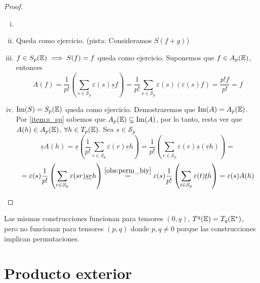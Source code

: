 \begin{proof}
    \begin{enumerate}[i)]
        \item[]
        \item Queda como ejercicio. (pista: Consideramos $S(f+g)$)
        \item $f \in S_p(\mathbb{E}) \implies S(f) = f$ queda como ejercicio.
        Suponemos que $f \in A_p(\mathbb{E})$, entonces
        \[
            A(f) = \frac{1}{p!} \left(\sum_{s \in \mathcal{S}_p} \varepsilon(s)\underline{s}f \right)
            = \frac{1}{p!}\sum_{s \in \mathcal{S}_p} \varepsilon(s) \left( \varepsilon(s)f \right) =
            \frac{p!f}{p!} = f
        \]
        \item $\operatorname{Im}(S)=S_p(\mathbb{E})$ queda como ejercicio. Demostraremos que $\operatorname{Im}(A)=A_p(\mathbb{E})$.
        Por \ref{item:s_sp} sabemos que $A_p(\mathbb{E}) \subseteq \operatorname{Im}(A)$, por lo tanto, resta
        ver que $A(h)\in A_p(\mathbb{E})$, $\forall h \in T_p(\mathbb{E})$. Sea $s \in \mathcal{S}_p$
        \[
            \underline{s}A(h) = \underline{s}\left( \frac{1}{p!}\sum_{r \in \mathcal{S}_p} \varepsilon(r)\underline{r}h
            \right) = \frac{1}{p!}\left(\sum_{r \in \mathcal{S}_p} \varepsilon(r)\underline{s}(\underline{r}h)\right) =
        \]
        \[
            = \varepsilon(s)\frac{1}{p!} \left( \sum_{r \in \mathcal{S}_p} \varepsilon(sr) \underline{sr}h \right)
            \stackrel{\ref{obs:perm_biy}}{=} \varepsilon(s)\frac{1}{p!} \left( \sum_{t \in \mathcal{S}_p} \varepsilon(t)
            \underline{t}h \right) = \varepsilon(s)A(h)
        \]
    \end{enumerate}
\end{proof}
\begin{obs}
	Las mismas construcciones funcionan para tensores $(0,q)$, $T^q(\mathbb{E}) = T_q(\mathbb{E}^*)$, pero no funcionan para
	tensores $(p,q)$ donde $p,q \neq 0$ porque las construcciones implican permutaciones.
\end{obs}


\section{Producto exterior}

